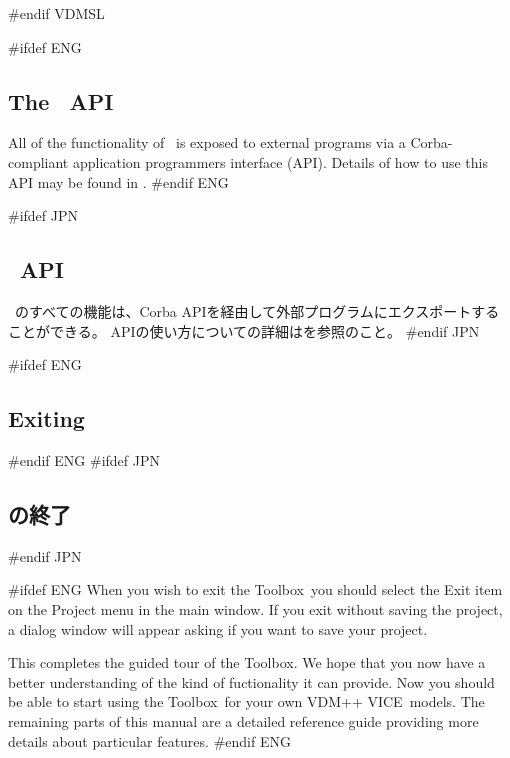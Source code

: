 \documentclass[\pformat,12pt]{article}
\newcommand{\vdmslpp}{VDM-SL}
\newcommand{\Toolbox}{Toolbox}
\newcommand{\vdmslpp}{VDM++}
\newcommand{\Toolbox}{Toolbox}
\renewcommand{\vdmslpp}{VDM++ VICE}
\newcommand{\guicmd}[1]{{\sf #1}}
\newcommand{\guicmd}[1]{{\gt #1}}
\begin{document}
#endif VDMSL

#ifdef ENG
\subsection{The \protect\VDMTools\ API}

All of the functionality of \VDMTools\ is exposed to external programs
via a Corba-compliant application programmers interface (API). Details
of how to use this API may be found in \cite{APIMan-SCSK}.
#endif ENG

#ifdef JPN
\subsection{\protect\VDMTools\ API}

\VDMTools\ のすべての機能は、Corba APIを経由して外部プログラムにエクスポートすることができる。
APIの使い方についての詳細は\cite{APIMan-SCSK}を参照のこと。
#endif JPN



#ifdef ENG
\subsection{Exiting \protect\VDMTools}
#endif ENG
#ifdef JPN
\subsection{\protect\VDMTools の終了}
#endif JPN

#ifdef ENG
When you wish to exit the \Toolbox\ you should select the
\guicmd{Exit} item on the \guicmd{Project} menu in
the main window. If you exit without saving the project, a dialog
window will appear asking if you want to save your project.

This completes the guided tour of the \Toolbox. We hope that you now have
a better understanding of the kind of fuctionality it can provide. Now
you should be able to start using the \Toolbox\ for your own
\vdmslpp\ models. The remaining parts of this manual are a detailed
reference guide providing more details about particular features.
#endif ENG
\end{document}
